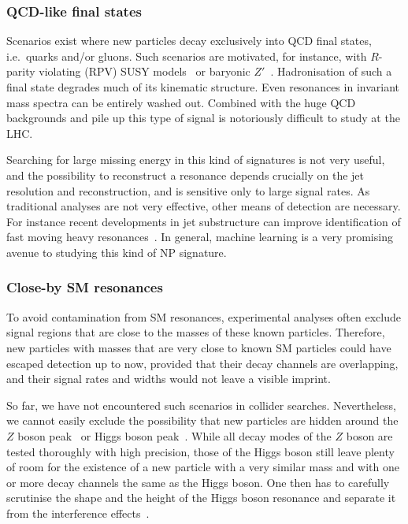 \documentclass[10pt]{article}
\begin{document}
\subsubsection{QCD-like final states}
%
Scenarios exist where new particles decay exclusively into QCD final states, i.e.\ quarks and/or gluons.
Such scenarios are motivated, for instance, with $R$-parity violating (RPV) SUSY models~\cite{Dreiner:2020qbi} or baryonic $Z'$~\cite{Cheung:2011zt}.
Hadronisation of such a final state degrades much of its kinematic structure. Even resonances in invariant mass spectra can be entirely washed out. Combined with the huge QCD backgrounds and pile up this type of signal is notoriously difficult to study at the LHC. 

Searching for large missing energy in this kind of signatures is not very useful, and the possibility to reconstruct a resonance depends crucially on the jet resolution and reconstruction, and is sensitive only to large signal rates.
As traditional analyses are not very effective, other means of detection are necessary.
For instance recent developments in jet substructure can improve identification of fast moving heavy resonances~\cite{Larkoski:2017jix}.
In general, machine learning is a very promising avenue to studying this kind of NP signature.



\subsubsection{Close-by SM resonances}
%
To avoid contamination from SM resonances, experimental analyses often exclude signal regions that are close to the masses of these known particles.
Therefore, new particles with masses that are very close to known SM particles could have escaped detection up to now, provided that their decay channels are overlapping, and their signal rates and widths would not leave a visible imprint.

So far, we have not encountered such scenarios in collider searches. 
Nevertheless, we cannot easily exclude the possibility that new particles are hidden around the $Z$ boson peak~\cite{Hook:2010tw} or Higgs boson peak~\cite{Gunion:2012he}. 
While all decay modes of the $Z$ boson are tested thoroughly with high precision, those of the Higgs boson still leave plenty of room for the existence of a new particle with a very similar mass and with one or more decay channels the same as the Higgs boson. One then has to carefully scrutinise the shape and the height of the Higgs boson resonance and separate it from the interference effects~\cite{Campbell:2017rke}. 
\end{document}
